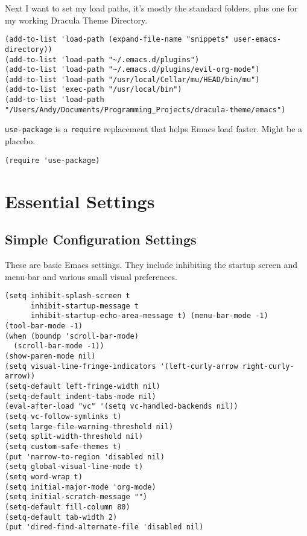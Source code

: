 \documentclass{article}
\begin{document}
Next I want to set my load paths, it's mostly the standard folders, plus one for my working Dracula Theme Directory.

\begin{verbatim}
(add-to-list 'load-path (expand-file-name "snippets" user-emacs-directory))
(add-to-list 'load-path "~/.emacs.d/plugins")
(add-to-list 'load-path "~/.emacs.d/plugins/evil-org-mode")
(add-to-list 'load-path "/usr/local/Cellar/mu/HEAD/bin/mu")
(add-to-list 'exec-path "/usr/local/bin")
(add-to-list 'load-path "/Users/Andy/Documents/Programming_Projects/dracula-theme/emacs")
\end{verbatim}

\texttt{use-package} is a \texttt{require} replacement that helps Emacs load faster. Might be a placebo.

\begin{verbatim}
(require 'use-package)
\end{verbatim}

\section{Essential Settings}
\label{sec-4}

\subsection{Simple Configuration Settings}
\label{sec-4-1}

These are basic Emacs settings. They include inhibiting the startup screen and menu-bar and various small visual preferences.

\begin{verbatim}
(setq inhibit-splash-screen t
      inhibit-startup-message t
      inhibit-startup-echo-area-message t) (menu-bar-mode -1)
(tool-bar-mode -1)
(when (boundp 'scroll-bar-mode)
  (scroll-bar-mode -1))
(show-paren-mode nil)
(setq visual-line-fringe-indicators '(left-curly-arrow right-curly-arrow))
(setq-default left-fringe-width nil)
(setq-default indent-tabs-mode nil)
(eval-after-load "vc" '(setq vc-handled-backends nil))
(setq vc-follow-symlinks t)
(setq large-file-warning-threshold nil)
(setq split-width-threshold nil)
(setq custom-safe-themes t)
(put 'narrow-to-region 'disabled nil)
(setq global-visual-line-mode t)
(setq word-wrap t)
(setq initial-major-mode 'org-mode)
(setq initial-scratch-message "")
(setq-default fill-column 80)
(setq-default tab-width 2)
(put 'dired-find-alternate-file 'disabled nil)
\end{verbatim}
\end{document}
